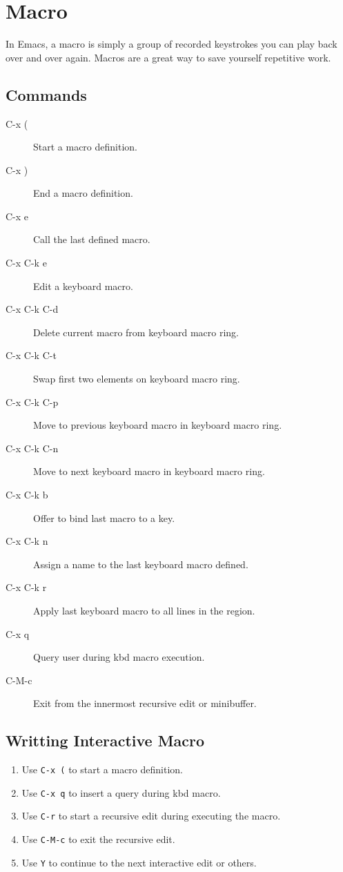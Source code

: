 
\chapter{Macro}
In Emacs, a macro is simply a group of recorded keystrokes you can play back over and over again.
Macros are a great way to save yourself repetitive work.

\section{Commands}

\begin{description}
\item[C-x (] Start a macro definition.
\item[C-x )] End a macro definition.
\item[C-x e] Call the last defined macro.
\item[C-x C-k e] Edit a keyboard macro.
\item[C-x C-k C-d] Delete current macro from keyboard macro ring.
\item[C-x C-k C-t] Swap first two elements on keyboard macro ring.
\item[C-x C-k C-p] Move to previous keyboard macro in keyboard macro ring.
\item[C-x C-k C-n] Move to next keyboard macro in keyboard macro ring.
\item[C-x C-k b] Offer to bind last macro to a key.
\item[C-x C-k n] Assign a name to the last keyboard macro defined.
\item[C-x C-k r] Apply last keyboard macro to all lines in the region.
\item[C-x q] Query user during kbd macro execution.
\item[C-M-c] Exit from the innermost recursive edit or minibuffer.
\end{description}


\section{Writting Interactive Macro}
\begin{enumerate}
\item Use \verb|C-x (| to start a macro definition.
\item Use \verb|C-x q| to insert a query during kbd macro.
\item Use \verb|C-r| to start a recursive edit during executing the macro.
\item Use \verb|C-M-c| to exit the recursive edit.
\item Use \verb|Y| to continue to the next interactive edit or others.
\end{enumerate}

